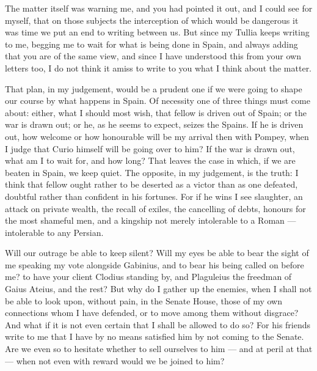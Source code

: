 

 The matter itself was warning me, and you had pointed it out, and I could see for myself, that on those subjects the interception of which would be dangerous it was time we put an end to writing between us. But since my Tullia keeps writing to me, begging me to wait for what is being done in Spain, and always adding that you are of the same view, and since I have understood this from your own letters too, I do not think it amiss to write to you what I think about the matter.

 That plan, in my judgement, would be a prudent one if we were going to shape our course by what happens in Spain. Of necessity one of three things must come about: either, what I should most wish, that fellow is driven out of Spain; or the war is drawn out; or he, as he seems to expect, seizes the Spains. If he is driven out, how welcome or how honourable will be my arrival then with Pompey, when I judge that Curio himself will be going over to him? If the war is drawn out, what am I to wait for, and how long? That leaves the case in which, if we are beaten in Spain, we keep quiet. The opposite, in my judgement, is the truth: I think that fellow ought rather to be deserted as a victor than as one defeated, doubtful rather than confident in his fortunes. For if he wins I see slaughter, an attack on private wealth, the recall of exiles, the cancelling of debts, honours for the most shameful men, and a kingship not merely intolerable to a Roman --- intolerable to any Persian.

 Will our outrage be able to keep silent? Will my eyes be able to bear the sight of me speaking my vote alongside Gabinius, and to bear his being called on before me? to have your client Clodius standing by, and Plaguleius the freedman of Gaius Ateius, and the rest? But why do I gather up the enemies, when I shall not be able to look upon, without pain, in the Senate House, those of my own connections whom I have defended, or to move among them without disgrace? And what if it is not even certain that I shall be allowed to do so? For his friends write to me that I have by no means satisfied him by not coming to the Senate. Are we even so to hesitate whether to sell ourselves to him --- and at peril at that --- when not even with reward would we be joined to him?

